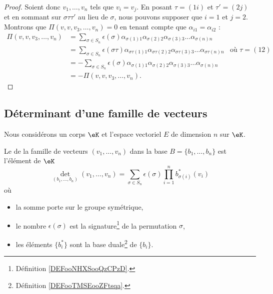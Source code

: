\begin{proof}
	Soient donc \( v_1,\ldots, v_n\) tels que \( v_i=v_j\). En posant \( \tau=(1i)\) et \( \tau'=(2j)\) et en sommant sur \( \sigma\tau\tau'\) au lieu de \( \sigma\), nous pouvons supposer que \( i=1\) et \( j=2\). Montrons que \( \Pi(v,v,v_3,\ldots, v_n)=0\) en tenant compte que \( \alpha_{i1}=\alpha_{i2}\) :
	\begin{subequations}
		\begin{align}
			\Pi(v,v,v_3,\ldots, v_n) & =\sum_{\sigma\in S_n}\epsilon(\sigma)\alpha_{\sigma(1)1}\alpha_{\sigma(2)2}\alpha_{\sigma(3)3}\ldots \alpha_{\sigma(n)n}                                            \\
			                         & =\sum_{\sigma\in S_n}\epsilon(\sigma\tau)\alpha_{\sigma\tau(1)1}\alpha_{\sigma\tau(2)2}\alpha_{\sigma\tau(3)3}\ldots \alpha_{\sigma\tau(n)n} & \text{où } \tau=(12) \\
			                         & =-\sum_{\sigma\in S_n}\epsilon(\sigma)\alpha_{\sigma(1)1}\alpha_{\sigma(2)2}\alpha_{\sigma(3)3}\ldots \alpha_{\sigma(n)n}                                           \\
			                         & =-\Pi(v,v,v_3,\ldots, v_n).
		\end{align}
	\end{subequations}
\end{proof}

\subsection{Déterminant d'une famille de vecteurs}

Nous considérons un corps \( \eK\) et l'espace vectoriel \( E\) de dimension \( n\) sur \( \eK\).

\begin{definition}\label{DEFooODDFooSNahPb}
    Le  de la famille de vecteurs \( (v_1,\ldots, v_n)\) dans la base \( B=\{ b_1,\ldots, b_n \}\) est l'élément de \( \eK\)
	\begin{equation}        \label{EQooOJEXooXUpwfZ}
		\det_{(b_1,\ldots, b_n)}(v_1,\ldots, v_n)=\sum_{\sigma\in S_n}\epsilon(\sigma)\prod_{i=1}^nb^*_{\sigma(i)}(v_i)
	\end{equation}
	où
	\begin{itemize}
		\item
		      la somme porte sur le groupe symétrique,
		\item
            le nombre \( \epsilon(\sigma)\) est la signature\footnote{Définition \ref{DEFooNHXSooQzCPzD}.} de la permutation \( \sigma\),
		\item
            les éléments \( \{ b^*_i \}\) sont la base duale\footnote{Définition \ref{DEFooTMSEooZFtsqa}.} de \( \{ b_i \}\).
	\end{itemize}
\end{definition}

